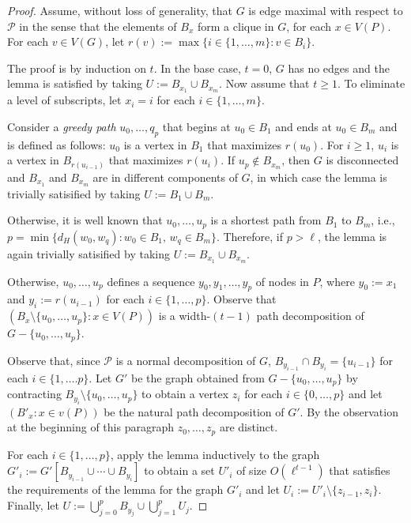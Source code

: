 \documentclass[kpfonts]{patmorin}
\theoremstyle{named}
\begin{document}
\begin{proof}
    Assume, without loss of generality, that $G$ is edge maximal with respect to $\mathcal{P}$ in the sense that the elements of $B_x$ form a clique in $G$, for each $x\in V(P)$.    For each $v\in V(G)$, let $r(v):=\max\{i\in\{1,\ldots,m\}:v\in B_i\}$.

    The proof is by induction on $t$. In the base case, $t=0$, $G$ has no edges and the lemma is satisfied by taking $U:=B_{x_1}\cup B_{x_m}$.  Now assume that $t\ge 1$. To eliminate a level of subscripts, let $x_i=i$ for each $i\in\{1,\ldots,m\}$.

    Consider a \emph{greedy path} $u_0,\ldots,q_p$ that begins at $u_0\in B_{1}$ and ends at $u_0\in B_{m}$ and is defined as follows: $u_0$ is a vertex in $B_{1}$ that maximizes $r(u_0)$.  For $i\ge 1$, $u_i$ is a vertex in $B_{r(u_{i-1})}$ that maximizes $r(u_i)$.  If $u_p\not\in B_{x_m}$, then $G$ is disconnected and $B_{x_1}$ and $B_{x_m}$ are in different components of $G$, in which case the lemma is trivially satisified by taking $U:=B_{1}\cup B_{m}$.

    Otherwise, it is well known that $u_0,\ldots,u_p$ is a shortest path from $B_{1}$ to $B_{m}$, i.e., $p=\min\{d_H(w_0,w_q): w_0\in B_1,\, w_q\in B_m\}$.  Therefore, if $p>\ell$, the lemma is again trivially satisified by taking $U:=B_{x_1}\cup B_{x_m}$.

    Otherwise, $u_0,\ldots,u_p$ defines a sequence $y_0,y_1,\ldots,y_p$ of nodes in $P$, where $y_0:=x_1$ and $y_{i}:=r(u_{i-1})$ for each $i\in\{1,\ldots,p\}$.
    Observe that $(B_x\setminus \{u_0,\ldots,u_p\}:x\in V(P))$ is a width-$(t-1)$ path decomposition of $G-\{u_0,\ldots,u_p\}$.

    Observe that, since $\mathcal{P}$ is a normal decomposition of $G$, $B_{y_{i-1}}\cap B_{y_{i}}=\{u_{i-1}\}$ for each $i\in\{1,\ldots.p\}$.  Let $G'$ be the graph obtained from $G-\{u_0,\ldots,u_p\}$ by contracting $B_{y_i}\setminus\{u_0,\ldots,u_p\}$ to obtain a vertex $z_i$ for each $i\in\{0,\ldots,p\}$ and let $(B'_x:x\in v(P))$ be the natural path decomposition of $G'$. By the observation at the beginning of this paragraph $z_0,\ldots,z_p$ are distinct.

    For each $i\in\{1,\ldots,p\}$, apply the lemma inductively to the graph $G'_i:=G'[B_{y_{i-1}}\cup\cdots\cup B_{y_i}]$ to obtain a set $U'_i$ of size $O(\ell^{t-1})$ that satisfies the requirements of the lemma for the graph $G'_i$ and let $U_i:=U'_i\setminus \{z_{i-1},z_i\}$.  Finally, let $U:=\bigcup_{j=0}^p B_{y_j}\cup\bigcup_{j=1}^p U_j$.


\end{proof}
\end{document}

